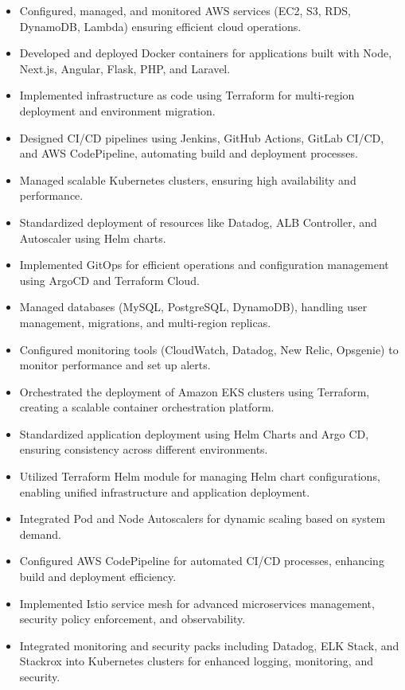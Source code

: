 \documentclass[10pt,a4paper,ragged2e,withhyper]{altacv}
\begin{document}
\divider

\begin{itemize}
    \item Configured, managed, and monitored AWS services (EC2, S3, RDS, DynamoDB, Lambda) ensuring efficient cloud operations.
    \item Developed and deployed Docker containers for applications built with Node, Next.js, Angular, Flask, PHP, and Laravel.
    \item Implemented infrastructure as code using Terraform for multi-region deployment and environment migration.
    \item Designed CI/CD pipelines using Jenkins, GitHub Actions, GitLab CI/CD, and AWS CodePipeline, automating build and deployment processes.
    \item Managed scalable Kubernetes clusters, ensuring high availability and performance.
    \item Standardized deployment of resources like Datadog, ALB Controller, and Autoscaler using Helm charts.
    \item Implemented GitOps for efficient operations and configuration management using ArgoCD and Terraform Cloud.
    \item Managed databases (MySQL, PostgreSQL, DynamoDB), handling user management, migrations, and multi-region replicas.
    \item Configured monitoring tools (CloudWatch, Datadog, New Relic, Opsgenie) to monitor performance and set up alerts.
\end{itemize}

\divider

\pagebreak


\vspace{10pt}

\begin{itemize}
    \item Orchestrated the deployment of Amazon EKS clusters using Terraform, creating a scalable container orchestration platform.
    \item Standardized application deployment using Helm Charts and Argo CD, ensuring consistency across different environments.
    \item Utilized Terraform Helm module for managing Helm chart configurations, enabling unified infrastructure and application deployment.
    \item Integrated Pod and Node Autoscalers for dynamic scaling based on system demand.
    \item Configured AWS CodePipeline for automated CI/CD processes, enhancing build and deployment efficiency.
    \item Implemented Istio service mesh for advanced microservices management, security policy enforcement, and observability.
    \item Integrated monitoring and security packs including Datadog, ELK Stack, and Stackrox into Kubernetes clusters for enhanced logging, monitoring, and security.
\end{itemize}
\end{document}
